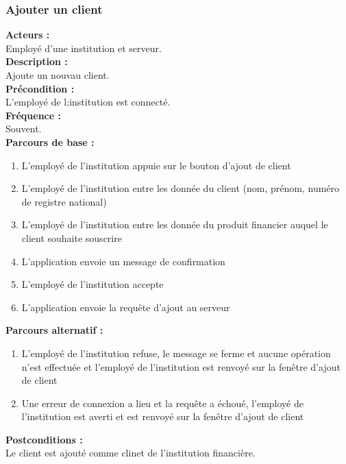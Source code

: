 \documentclass[../rapport.tex]{subfiles}
\begin{document}
\subsubsection{Ajouter un client}

\textbf{Acteurs :} \\
Employé d'une institution et serveur. \\

\textbf{Description :} \\
Ajoute un nouvau client. \\

\textbf{Précondition :} \\
L'employé de l;institution est connecté. \\

\textbf{Fréquence :} \\
Souvent. \\

\textbf{Parcours de base :} \\
\begin{enumerate}
    \item L’employé de l’institution appuie sur le bouton d’ajout de client
    \item L’employé de l’institution entre les donnée du client (nom, prénom, numéro	de registre national)
    \item L’employé de l’institution entre les donnée du produit financier auquel le client souhaite souscrire
    \item L’application envoie un message de confirmation
    \item L’employé de l’institution accepte
    \item L’application envoie la requête d’ajout au serveur
\end{enumerate}
\bigskip

\textbf{Parcours alternatif :}
\begin{enumerate}
    \item L'employé de l'institution refuse, le message se ferme et aucune opération n'est effectuée et l'employé de l'institution est renvoyé sur la fenêtre d'ajout de client
    \item Une erreur de connexion a lieu et la requête a échoué, l'employé de l'institution est averti et est renvoyé sur la fenêtre d'ajout de client
\end{enumerate}

\textbf{Postconditions :} \\
Le client est ajouté comme clinet de l'institution financière. \\
\end{document}
